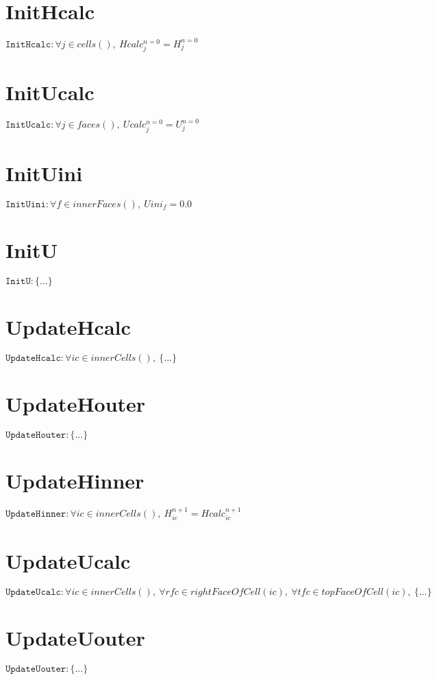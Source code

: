 \documentclass[11pt]{article}
\begin{document}
\section{InitHcalc}
$\texttt{InitHcalc} : \forall{j\in cells()}, \ Hcalc^{n=0}_{j} = H^{n=0}_{j}$


\section{InitUcalc}
$\texttt{InitUcalc} : \forall{j\in faces()}, \ Ucalc^{n=0}_{j} = U^{n=0}_{j}$


\section{InitUini}
$\texttt{InitUini} : \forall{f\in innerFaces()}, \ Uini_{f} = 0.0$


\section{InitU}
$\texttt{InitU} : \{ ... \}$


\section{UpdateHcalc}
$\texttt{UpdateHcalc} : \forall{ic\in innerCells()}, \ \{ ... \}$


\section{UpdateHouter}
$\texttt{UpdateHouter} : \{ ... \}$


\section{UpdateHinner}
$\texttt{UpdateHinner} : \forall{ic\in innerCells()}, \ H^{n+1}_{ic} = Hcalc^{n+1}_{ic}$


\section{UpdateUcalc}
$\texttt{UpdateUcalc} : \forall{ic\in innerCells()}, \ \forall{rfc\in rightFaceOfCell(ic)}, \ \forall{tfc\in topFaceOfCell(ic)}, \ \{ ... \}$


\section{UpdateUouter}
$\texttt{UpdateUouter} : \{ ... \}$
\end{document}
